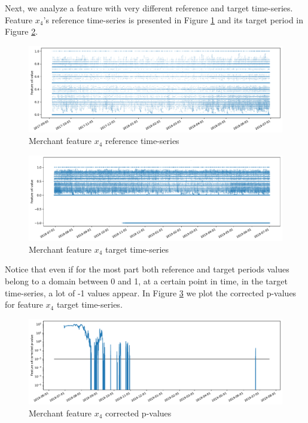 \documentclass[sigconf]{acmart}
\begin{document}
Next, we analyze a feature with very different reference and target time-series. Feature $x_4$'s reference time-series is presented in Figure \ref{fig:merchant-x4-reference} and its target period in Figure \ref{fig:merchant-x4-target}.
\begin{figure}[!htb]
    \begin{center}
      \includegraphics[scale=0.25]{figures/merchant-x4-reference.pdf}
      \caption{Merchant feature $x_4$ reference time-series}
      \label{fig:merchant-x4-reference}
    \end{center}
\end{figure}
\begin{figure}[!htb]
    \begin{center}
      \includegraphics[scale=0.25]{figures/merchant-x4-target.pdf}
      \caption{Merchant feature $x_4$ target time-series}
      \label{fig:merchant-x4-target}
    \end{center}
\end{figure}
Notice that even if for the most part both reference and target periods values belong to a domain between 0 and 1, at a certain point in time, in the target time-series, a lot of -1 values appear. In Figure \ref{fig:merchant-x4-correctedpvalues} we plot the corrected p-values for feature $x_4$ target time-series.
\begin{figure}[!htb]
    \begin{center}
      \includegraphics[scale=0.25]{figures/merchant-x4-correctedpvalues.pdf}
      \caption{Merchant feature $x_4$ corrected p-values}
      \label{fig:merchant-x4-correctedpvalues}
    \end{center}
\end{figure}
\end{document}
